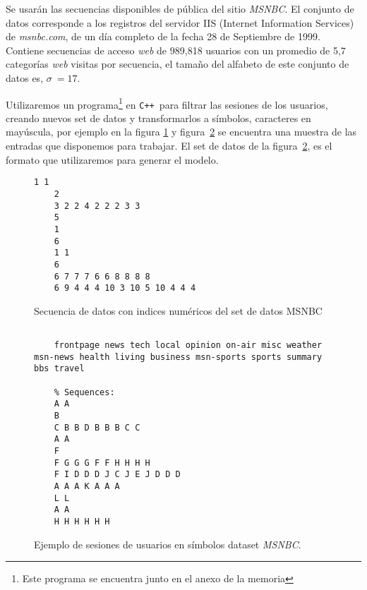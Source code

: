 
Se usarán las secuencias disponibles de \webasccesslog pública del sitio \emph{MSNBC}. El conjunto de datos corresponde a los registros del servidor {IIS} (Internet Information Services) de \emph{msnbc.com}, de un día completo de la fecha  28 de Septiembre de 1999. Contiene secuencias de acceso \emph{web} de 989,818 usuarios con un promedio de 5,7 categorías \emph{web} visitas por secuencia, el tamaño del alfabeto de este conjunto de datos es, $\sigma \ = 17$.




Utilizaremos un programa\footnote{Este programa se encuentra junto en el anexo de la memoria} en \texttt{C++ }para filtrar las sesiones de los usuarios, creando nuevos set de datos y transformarlos a símbolos, caracteres en mayúscula, por ejemplo en la figura \ref{fig:sesiones-ds-msbc-num}  y figura~\ref{fig:sesiones-ds-basicos} se encuentra una muestra de las entradas que disponemos para trabajar. El set de datos de la figura~\ref{fig:sesiones-ds-basicos}, es el formato que utilizaremos para generar el modelo.


\begin{figure}[t] 
	\centering
	\begin{lstlisting}[frame=single,basicstyle=\ttfamily\tiny,]
	1 1 
	2 
	3 2 2 4 2 2 2 3 3 
	5 
	1 
	6 
	1 1 
	6 
	6 7 7 7 6 6 8 8 8 8 
	6 9 4 4 4 10 3 10 5 10 4 4 4 
	\end{lstlisting}	
	\caption{Secuencia de datos con indices numéricos del set de datos MSNBC}
	\label{fig:sesiones-ds-msbc-num}
\end{figure}




\begin{figure}[t] 
	\centering
	\begin{lstlisting}[frame=single,basicstyle=\ttfamily\tiny,]
	% Different categories found in input file:
	
	frontpage news tech local opinion on-air misc weather msn-news health living business msn-sports sports summary bbs travel
	
	% Sequences:
	A A 
	B 
	C B B D B B B C C 
	A A 
	F 
	F G G G F F H H H H 
	F I D D D J C J E J D D D 
	A A A K A A A 
	L L 
	A A 
	H H H H H H 
	\end{lstlisting}
	\caption{Ejemplo de sesiones de usuarios en símbolos dataset \emph{MSNBC}.}
	\label{fig:sesiones-ds-basicos}
\end{figure}






